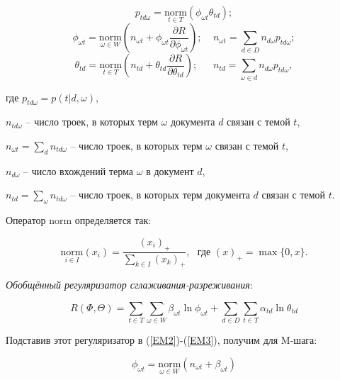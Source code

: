 \documentclass[a4paper, 12pt]{article}
\begin{document}
    \begin{equation}\label{EM1}
        p_{td\omega} = \underset{t \in T}{\text{norm}}(\phi_{\omega t}\theta_{td});
    \end{equation}
    \begin{equation}\label{EM2}
        \phi_{\omega t} = \underset{\omega \in W}{\text{norm}}\left(n_{\omega t} + \phi_{\omega t} \frac{\partial R}{\partial \phi_{\omega t}}\right); ~~~~~ n_{\omega t} = \sum\limits_{d \in D}n_{d \omega}p_{td\omega};
    \end{equation}
    \begin{equation}\label{EM3}
        \theta_{td} = \underset{t \in T}{\text{norm}}\left(n_{td} + \theta_{td} \frac{\partial R}{\partial \theta_{td}}\right); ~~~~~~~ n_{td} = \sum\limits_{\omega \in d}n_{d \omega}p_{td\omega},
    \end{equation}

    где $p_{td\omega} = p(t | d, \omega)$, 
    
    $n_{td\omega}$ -- число троек, в которых терм $\omega$ документа $d$ связан с темой $t$, 
    
    $n_{\omega t} = \sum_dn_{td\omega}$ -- число троек, в которых терм $\omega$ связан с темой $t$,

    $n_{d \omega}$ -- число вхождений терма $\omega$ в документ $d$,

    $n_{td} = \sum_{\omega}n_{td\omega}$ -- число троек, в которых терм документа $d$ связан с темой $t$.
    
    Оператор norm определяется так:

    \[\underset{i \in I}{\text{norm}}(x_i) = \frac{(x_i)_{+}}{\sum\limits_{k \in I}(x_k)_{+}}, ~~~ \text{где } (x)_{+} = \max\{0, x\}.\]

    \textit{Обобщённый регуляризатор сглаживания-разреживания}:

    \begin{equation}
        R(\Phi, \Theta) = \sum\limits_{t \in T}\sum\limits_{\omega \in W}\beta_{\omega t}\ln\phi_{\omega t} + \sum\limits_{d \in D}\sum\limits_{t \in T}\alpha_{td}\ln\theta_{td}
    \end{equation}

    Подставив этот регуляризатор в (\ref{EM2})-(\ref{EM3}), получим для M-шага:

    \begin{equation}
        \phi_{\omega t} = \underset{\omega \in W}{\text{norm}}(n_{\omega t} + \beta_{\omega t})
    \end{equation}
\end{document}
